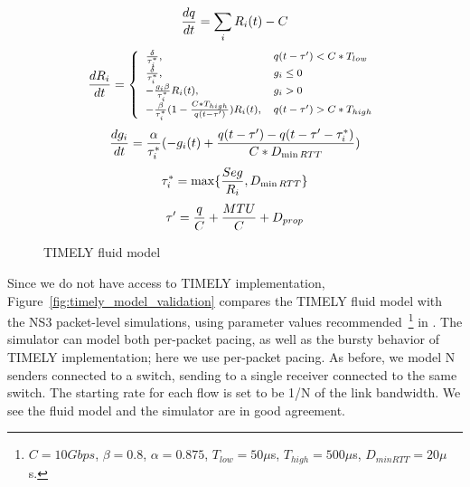 \begin{figure}[h]
\fbox
{
\begin{minipage}{\columnwidth}
\begin{equation}
\small
\frac{{dq}}{{dt}} = \sum_{i} R_i(t) - C\\
\label{eq:timely_q}
\end{equation}
\begin{equation}
\small
\frac{{dR_i}}{{dt}} = \left\{ \begin{array}{ll}
\frac{\delta }{{\tau_i^*}}, & q(t - \tau ') < C*{T_{low}}\\
\frac{\delta }{{\tau_i^*}}, & g_i \le 0\\
 - \frac{{g_i\beta }}{{\tau_i^*}}R_i(t), & g_i > 0\\
 - \frac{\beta }{{\tau_i^*}}(1 - \frac{{C*{T_{high}}}}{{q(t - \tau ')}})R_i(t), & q(t - \tau ') > C*{T_{high}}
\end{array} \right.\\
\label{eq:timely_r}
\end{equation}
\begin{equation}
\small
\frac{{dg_i}}{{dt}} = \frac{\alpha }{{\tau_i^*}}( - g_i(t) + \frac{{q(t - \tau ') - q(t - \tau ' - \tau_i^*)}}{{C*{D_{\min RTT}}}})\\
\label{eq:timely_g}
\end{equation}
\begin{equation}
\small
\tau_i^* = \max \{ \frac{{Seg}}{R_i},{D_{\min RTT}}\} \\
\label{eq:timely_taus}
\end{equation}
\begin{equation}
\small
\tau ' = \frac{q}{C} + \frac{{MTU}}{C} + {D_{prop}}
\label{eq:timely_taup}
\end{equation}
\end{minipage}
}
\caption{TIMELY fluid model}
\vspace{-1em}
\label{fig:timely_model}
\end{figure}

Since we do not have access to TIMELY implementation,
Figure~\ref{fig:timely_model_validation} compares the TIMELY fluid model with
the NS3 packet-level simulations, using parameter values
recommended~\footnote{$C=10Gbps$, $\beta=0.8$, $\alpha=0.875$, $T_{low} =
50\mu$s, $T_{high} = 500\mu$s, $D_{minRTT}= 20 \mu$s.} in \cite{timely}. The
simulator can model both per-packet pacing, as well as the bursty behavior of
TIMELY implementation; here we use per-packet pacing. As before, we model N
senders connected to a switch, sending to a single receiver connected to the
same switch.  The starting rate for each flow is set to be 1/N of the link
bandwidth. We see the fluid model and the simulator are in good agreement.

